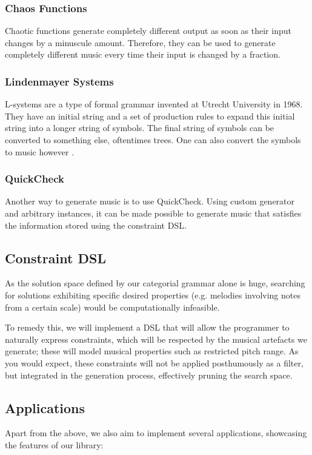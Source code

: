 \documentclass[12pt,a4paper]{article}
\begin{document}
\subsubsection{Chaos Functions}
Chaotic functions generate completely different output as soon as their input changes by a minuscule amount. Therefore, they can be used to generate completely different music every time their input is changed by a fraction.
\subsubsection{Lindenmayer Systems}
L-systems \cite{lsystem-original} are a type of formal grammar invented at Utrecht University in 1968. They have an initial string and a set of production rules to expand this initial string into a longer string of symbols. The final string of symbols can be converted to something else, oftentimes trees. One can also convert the symbols to music however \cite{lsystem}.
\subsubsection{QuickCheck}
Another way to generate music is to use QuickCheck. Using custom generator and arbitrary instances, it can be made possible to generate music that satisfies the information stored using the constraint DSL.

\subsection{Constraint DSL}
As the solution space defined by our categorial grammar alone is huge, searching for solutions exhibiting specific desired properties (e.g. melodies involving notes from a certain scale) would be computationally infeasible.

To remedy this, we will implement a DSL that will allow the programmer to naturally express constraints, which will be respected by the musical artefacts we generate; these will model musical properties such as restricted pitch range. As you would expect, these constraints will not be applied posthumously as a filter, but integrated in the generation process, effectively pruning the search space.

\subsection{Applications}
Apart from the above, we also aim to implement several applications, showcasing the features of our library:
\vspace{-15pt}
\end{document}
